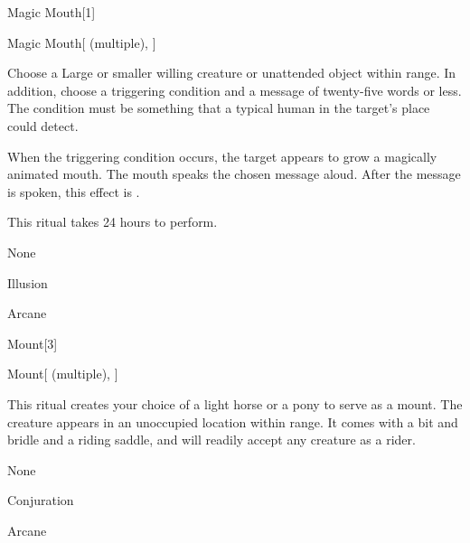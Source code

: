 \begin{spellsection}{Magic Mouth}[1]


\begin{ability}{Magic Mouth}[ (multiple), ]

Choose a Large or smaller willing creature or unattended object within \rngclose range.
In addition, choose a triggering condition and a message of twenty-five words or less.
The condition must be something that a typical human in the target's place could detect.

When the triggering condition occurs, the target appears to grow a magically animated mouth.
The mouth speaks the chosen message aloud.
After the message is spoken, this effect is .

This ritual takes 24 hours to perform.

\end{ability}


 None

 Illusion

 Arcane
\end{spellsection}


\begin{spellsection}{Mount}[3]


\begin{ability}{Mount}[ (multiple), ]

This ritual creates your choice of a light horse or a pony to serve as a mount.
The creature appears in an unoccupied location within \rngclose range.
It comes with a bit and bridle and a riding saddle, and will readily accept any creature as a rider.

\end{ability}


 None

 Conjuration

 Arcane
\end{spellsection}


